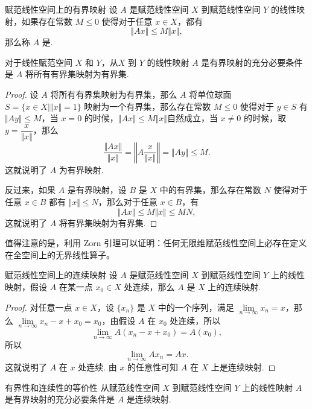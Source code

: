 \begin{definition}{赋范线性空间上的有界映射}{}
    设 $A$ 是赋范线性空间 $X$ 到赋范线性空间 $Y$ 的线性映射，如果存在常数 $M\leqslant 0$ 使得对于任意 $x\in X$，都有 \[\Vert Ax\Vert\leqslant M\Vert x\Vert,\]
    那么称 $A$ 是.
\end{definition}

\begin{theorem}{}{}
    对于线性赋范空间 $X$ 和 $Y$，从$X$ 到 $Y$ 的线性映射 $A$ 是有界映射的充分必要条件是 $A$ 将所有有界集映射为有界集.
\end{theorem}

\begin{proof}
    设 $A$ 将所有有界集映射为有界集，那么 $A$ 将单位球面 $S=\{x\in X \mid \Vert x\Vert=1\}$ 映射为一个有界集，那么存在常数 $M\leqslant 0$ 使得对于 $y\in S$ 有 $\Vert Ay\Vert\leqslant M$，当 $x = 0$ 的时候，$\Vert Ax\Vert \leqslant M\Vert x\Vert$自然成立，当 $x \neq 0$ 的时候，取 $y=\dfrac{x}{\Vert x\Vert}$，那么 \[\frac{\Vert Ax\Vert}{\Vert x\Vert} = \left\Vert A\frac{x}{\Vert x\Vert}\right\Vert = \Vert Ay\Vert \leqslant M.\] 这就说明了 $A$ 为有界映射.

    反过来，如果 $A$ 是有界映射，设 $B$ 是 $X$ 中的有界集，那么存在常数 $N$ 使得对于任意 $x\in B$ 都有 $\Vert x\Vert\leqslant N$，那么对于任意 $x\in B$，有 \[\Vert Ax\Vert\leqslant M\Vert x\Vert\leqslant MN,\]这就说明了 $A$ 将有界集映射为有界集.
\end{proof}

值得注意的是，利用 Zorn 引理可以证明：任何无限维赋范线性空间上必存在定义在全空间上的无界线性算子。

\begin{theorem}{赋范线性空间上的连续映射}{}
    设 $A$ 是赋范线性空间 $X$ 到赋范线性空间 $Y$ 上的线性映射，假设 $A$ 在某一点 $x_0\in X$ 处连续，那么 $A$ 是 $X$ 上的连续映射.
\end{theorem}

\begin{proof}
    对任意一点 $x\in X$，设 $\{x_n\}$ 是 $X$ 中的一个序列，满足 $\lim\limits_{n\to\infty}x_n = x$，那么 $\lim\limits_{n\to\infty}x_n - x + x_0 = x_0$，由假设 $A$ 在 $x_0$ 处连续，所以 \[\lim\limits_{n\to\infty}A(x_n - x + x_0) = A(x_0),\]
    所以 \[\lim\limits_{n\to\infty}Ax_n = Ax.\]
    这就说明了 $A$ 在 $x$ 处连续. 由 $x$ 的任意性可知 $A$ 在 $X$ 上是连续映射.
\end{proof}

\begin{theorem}{有界性和连续性的等价性}{}
    从赋范线性空间 $X$ 到赋范线性空间 $Y$ 上的线性映射 $A$ 是有界映射的充分必要条件是 $A$ 是连续映射.
\end{theorem}


